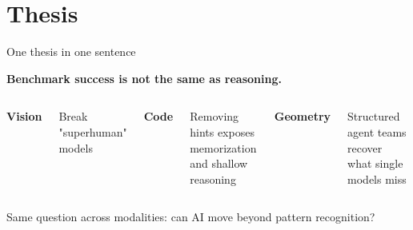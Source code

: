 \section{Thesis}

\begin{frame}{One thesis in one sentence}
  \vspace{0.5em}

  \begin{center}
    \Large
    \textbf{Benchmark success is not the same as reasoning.}
  \end{center}

  \vspace{1em}

  \begin{columns}[T]
    \centering
    \textbf{Vision}

    \vspace{0.3em}

    Break "superhuman" models

    \centering
    \textbf{Code}

    \vspace{0.3em}

    Removing hints exposes memorization and shallow reasoning

    \centering
    \textbf{Geometry}

    \vspace{0.3em}

    Structured agent teams recover what single models miss
  \end{columns}

  \vspace{1em}

  \begin{center}
    \small
    Same question across modalities: can AI move beyond pattern recognition?
  \end{center}

\end{frame}
